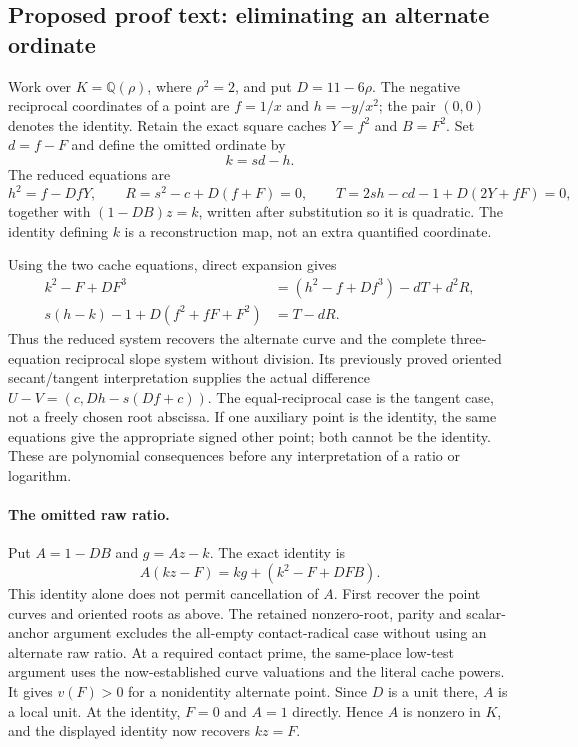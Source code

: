 \subsection{Proposed proof text: eliminating an alternate ordinate}
\label{outline:r6-expanded-elimination}
Work over $K=\mathbb Q(\rho)$, where $\rho^2=2$, and put
$D=11-6\rho$. The negative reciprocal coordinates of a point are
$f=1/x$ and $h=-y/x^2$; the pair $(0,0)$ denotes the identity.
Retain the exact square caches $Y=f^2$ and $B=F^2$.
Set $d=f-F$ and define the omitted ordinate by
\[
 k=sd-h.
\]
The reduced equations are
\[
 h^2=f-DfY,\qquad
 R=s^2-c+D(f+F)=0,\qquad
 T=2sh-cd-1+D(2Y+fF)=0,
\]
together with $(1-DB)z=k$, written after substitution so it is quadratic.
The identity defining $k$ is a reconstruction map, not an extra
quantified coordinate.

Using the two cache equations, direct expansion gives
\begin{align*}
 k^2-F+DF^3&=(h^2-f+Df^3)-dT+d^2R,\\
 s(h-k)-1+D(f^2+fF+F^2)&=T-dR.
\end{align*}
Thus the reduced system recovers the alternate curve and the complete
three-equation reciprocal slope system without division. Its previously
proved oriented secant/tangent interpretation supplies the actual
difference $U-V=(c,Dh-s(Df+c))$. The equal-reciprocal case is the tangent
case, not a freely chosen root abscissa. If one auxiliary point is the
identity, the same equations give the appropriate signed other point;
both cannot be the identity. These are polynomial consequences before
any interpretation of a ratio or logarithm.

\paragraph{The omitted raw ratio.}
Put $A=1-DB$ and $g=Az-k$. The exact identity is
\[
 A(kz-F)=kg+(k^2-F+DFB).
\]
This identity alone does not permit cancellation of $A$. First recover
the point curves and oriented roots as above. The retained nonzero-root,
parity and scalar-anchor argument excludes the all-empty contact-radical
case without using an alternate raw ratio. At a required contact prime,
the same-place low-test argument uses the now-established curve
valuations and the literal cache powers. It gives $v(F)>0$ for a
nonidentity alternate point. Since $D$ is a unit there, $A$ is a local
unit. At the identity, $F=0$ and $A=1$ directly. Hence $A$ is nonzero in
$K$, and the displayed identity now recovers $kz=F$.

